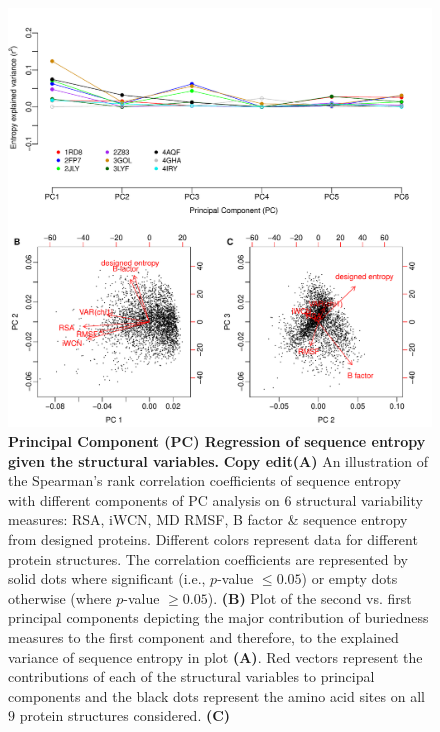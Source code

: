 \documentclass[12pt]{article}
\begin{document}
\begin{figure}[tbh]
\begin{center}
       \includegraphics[width=6.5in]{cor_entropy_PC_screen.pdf}
\end{center}
\caption{\textbf{Principal Component (PC) Regression of sequence entropy given the structural variables.} {\color{blue}\textbf{Copy edit}{\bf (A)} An illustration of the Spearman's rank correlation coefficients of sequence entropy with different components of PC analysis on $6$ structural variability measures: RSA, iWCN, MD RMSF, B factor \& sequence entropy from designed proteins. Different colors represent data for different protein structures. The correlation coefficients are represented by solid dots where significant (i.e., $p$-value $\leq0.05$) or empty dots otherwise (where $p$-value $\geq0.05$). {\bf (B)} Plot of the second vs. first principal components depicting the major contribution of buriedness measures to the first component and therefore, to the explained variance of sequence entropy in plot {\bf (A)}. Red vectors represent the contributions of each of the structural variables to principal components and the black dots represent the amino acid sites on all $9$ protein structures considered. {\bf (C)}}}
\label{fig:cor_entropy_PC_screen}
\end{figure}
\end{document}
